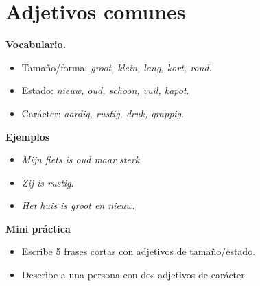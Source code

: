 \section{Adjetivos comunes}
\textbf{Vocabulario.}
\begin{itemize}[leftmargin=*]
  \item Tamaño/forma: \textit{groot, klein, lang, kort, rond}.
  \item Estado: \textit{nieuw, oud, schoon, vuil, kapot}.
  \item Carácter: \textit{aardig, rustig, druk, grappig}.
\end{itemize}

\textbf{Ejemplos}
\begin{itemize}[leftmargin=*]
  \item \textit{Mijn fiets is oud maar sterk}.
  \item \textit{Zij is rustig}.
  \item \textit{Het huis is groot en nieuw}.
\end{itemize}

\textbf{Mini práctica}
\begin{itemize}[leftmargin=*]
  \item Escribe 5 frases cortas con adjetivos de tamaño/estado.
  \item Describe a una persona con dos adjetivos de carácter.
\end{itemize}
